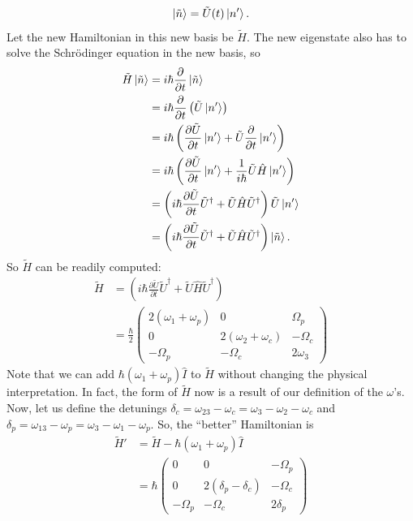 \documentclass{article}
\theoremstyle{definition}
\begin{document}
\begin{align}
\ket{\tilde{n}} = \tilde{U}(t)\ket{n'}.
\end{align}
Let the new Hamiltonian in this new basis be $\tilde{H}$. The new eigenstate also has to solve the Schr\"{o}dinger equation in the new basis, so
\begin{align}
\tilde{H}\ket{\tilde{n}} &= i\hbar \frac{\partial }{\partial t}\ket{\tilde{n}}\nonumber \\
&= i\hbar\frac{\partial}{\partial t}\left(\tilde{U}\ket{n'} \right) \nonumber\\
&= i\hbar\left( \frac{\partial \tilde{U}}{\partial t}\ket{n'} + \tilde{U}\frac{\partial}{\partial t}\ket{n'}\right)\nonumber\\
&=  i\hbar\left( \frac{\partial \tilde{U}}{\partial t}\ket{n'} + \frac{1}{i\hbar}\tilde{U}\hat{H}\ket{n'}\right) \nonumber\\
&= \left(i\hbar \frac{\partial \tilde{U}}{\partial t}\tilde{U}^\dagger + \tilde{U}\hat{H}\tilde{U}^\dagger \right) \tilde{U}\ket{n'}\nonumber\\
&= \left(i\hbar \frac{\partial \tilde{U}}{\partial t}\tilde{U}^\dagger + \tilde{U}\hat{H}\tilde{U}^\dagger \right) \ket{\tilde{n}}.
\end{align}
So $\tilde{H}$ can be readily computed:
\begin{align}
\tilde{H} &= \left(i\hbar \frac{\partial \tilde{U}}{\partial t}\tilde{U}^\dagger + \tilde{U}\hat{H}\tilde{U}^\dagger \right)\nonumber\\
&= \frac{\hbar}{2}\begin{pmatrix}
2(\omega_1 + \omega_p) & 0 & \Omega_p\\
0 & 2(\omega_2+\omega_c) & -\Omega_c\\
-\Omega_p & -\Omega_c & 2\omega_3
\end{pmatrix}
\end{align}
Note that we can add $\hbar(\omega_1+\omega_p)\hat{I}$ to $\tilde{H}$ without changing the physical interpretation. In fact, the form of $\tilde{H}$ now is a result of our definition of the $\omega$'s. Now, let us define the detunings $\delta_c = \omega_{23}-\omega_c = \omega_3 - \omega_2 - \omega_c $ and $\delta_p = \omega_{13} - \omega_p = \omega_3 - \omega_1 - \omega_p$. So, the ``better'' Hamiltonian is
\begin{align}
\tilde{H}' &= \tilde{H} - \hbar(\omega_1+\omega_p)\hat{I}\nonumber\\
&= \hbar\begin{pmatrix}
0 & 0 & -\Omega_p\\
0 & 2(\delta_p - \delta_c) & -\Omega_c\\
-\Omega_p & -\Omega_c & 2\delta_p
\end{pmatrix}
\end{align}
\end{document}
